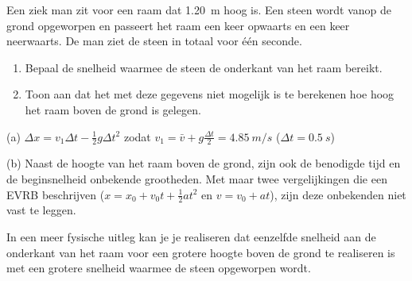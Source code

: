 

\item{}Een ziek man zit voor een raam dat \SI{1,20}{m} hoog is. Een steen wordt vanop de grond opgeworpen en passeert het raam een keer opwaarts en een keer neerwaarts. De man ziet de steen in totaal voor \'e\'en seconde.%
\begin{enumerate}
\item Bepaal de snelheid waarmee de steen de onderkant van het raam bereikt.%
\item Toon aan dat het met deze gegevens niet mogelijk is te berekenen hoe hoog het raam boven de grond is gelegen.
\end{enumerate}

\begin{oplossing}
	(a) $\Delta x= v_1\Delta t-\frac{1}{2}g\Delta t^2$ zodat $v_1=\bar{v}+g\frac{\Delta t}{2}=\SI{4,85}{m/s}$ ($\Delta t = \SI{0,5}{s}$)
	
	(b) Naast de hoogte van het raam boven de grond, zijn ook de benodigde tijd en de beginsnelheid onbekende grootheden. Met maar twee vergelijkingen die een EVRB beschrijven ($x=x_0+v_0t+\frac{1}{2}at^2$ en $v=v_0+at$), zijn deze onbekenden niet vast te leggen. 
	
	In een meer fysische uitleg kan je je realiseren dat eenzelfde snelheid aan de onderkant van het raam voor een grotere hoogte boven de grond te realiseren is met een grotere snelheid waarmee de steen opgeworpen wordt.
\end{oplossing}



